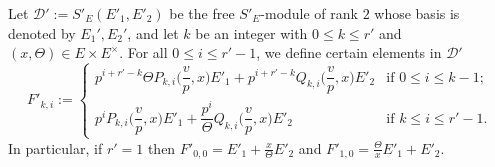 \documentclass[11pt]{amsart}
\theoremstyle{definition}
\numberwithin{equation}{subsection}
\theoremstyle{plain}
\theoremstyle{plain}
\theoremstyle{plain}
\theoremstyle{plain}
\theoremstyle{plain}
\theoremstyle{plain}
\theoremstyle{plain}
\theoremstyle{plain}
\theoremstyle{plain}
\theoremstyle{plain}
\theoremstyle{plain}
\theoremstyle{plain}
\theoremstyle{definition}
\theoremstyle{definition}
\theoremstyle{definition}
\theoremstyle{remark}
\renewcommand{\(}{\textup{(}}
\renewcommand{\)}{\textup{)}}
\newcommand{\cD}{\mathcal{D}}
\begin{document}
Let $\cD':=S'_E(E'_1,E'_2)$ be the free $S'_E$-module of rank $2$ whose basis is denoted by $E_1',E_2'$, and let $k$ be an integer with $0\leq k\leq r'$ and $(x,\Theta)\in E\times E^{\times}$. For all $0\leq i\leq r'-1$, we define certain elements in $\cD'$
\begin{equation}\label{eq: definition of F'_k,i}
    F'_{k,i}:=
    \begin{cases}
        p^{i+r'-k}\Theta P_{k,i}\Big(\dfrac{v}{p},x\Big)E'_1
        +p^{i+r'-k}Q_{k,i}\Big(\dfrac{v}{p},x\Big)E'_2
        & \mbox{if } 0\leq i\leq k-1; \\
        p^i P_{k,i}\Big(\dfrac{v}{p},x\Big)E'_1
        +\dfrac{p^i}{\Theta} Q_{k,i}\Big(\dfrac{v}{p},x\Big)E'_2
        & \mbox{if } k\leq i\leq r'-1.
    \end{cases}
\end{equation}
In particular, if $r'=1$ then $F'_{0,0}=E'_1+\frac{x}{\Theta}E'_2$ and $F'_{1,0}=\frac{\Theta}{x}E'_1+E'_2$.
\end{document}
